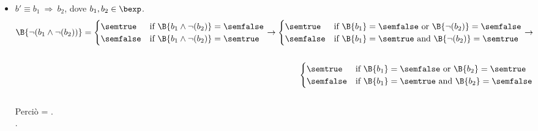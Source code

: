 {\begin{enumerate}[label=(\alph*)]
\begin{itemize}
\begin{align*}
      \begin{cases}
      \semtrue &
      \mbox{if} \ \A{a_1} \not \leq \A{a_2}
                  \mbox{ or }
                  \A{a_1} = \A{a_2} \\
      \semfalse &
      \mbox{if} \ \A{a_1} \leq \A{a_2}
                  \mbox{ and }
                  \A{a_1} \neq \A{a_2} \\
      \end{cases}
      \rightarrow \\ \\
      \begin{cases}
      \semtrue &
      \mbox{if} \ \A{a_1} \geq \A{a_2} \\
      \semfalse &
      \mbox{if} \ \A{a_1} < \A{a_2} \\
      \end{cases}
    \end{align*} \\
      Perciò  =
      . \\.

    \item $ b' \equiv b_1 \ \Rightarrow \ b_2$, dove $b_1, b_2 \in \bexp$. \\
    \begin{align*}
      \B{\lnot(b_1 \land \lnot(b_2))} =
      \begin{cases}
      \semtrue &
      \mbox{if} \ \B{b_1 \land \lnot(b_2)} = \semfalse \\
      \semfalse &
      \mbox{if} \ \B{b_1 \land \lnot(b_2)} = \semtrue \\
      \end{cases}
      \rightarrow
      \begin{cases}
      \semtrue &
      \mbox{if} \ \B{b_1} = \semfalse
                  \mbox{ or }
                  \B{\lnot(b_2)} = \semfalse \\
      \semfalse &
      \mbox{if} \ \B{b_1} = \semtrue
                  \mbox{ and }
                  \B{\lnot(b_2)} = \semtrue \\
      \end{cases}
      \rightarrow \\ \\
      \begin{cases}
      \semtrue &
      \mbox{if} \ \B{b_1} = \semfalse
                  \mbox{ or }
                  \B{b_2} = \semtrue \\
      \semfalse &
      \mbox{if} \ \B{b_1} = \semtrue
                  \mbox{ and }
                  \B{b_2} = \semfalse \\
      \end{cases}
    \end{align*} \\
      Perciò  =
      . \\.


\end{itemize}
\end{enumerate}}
